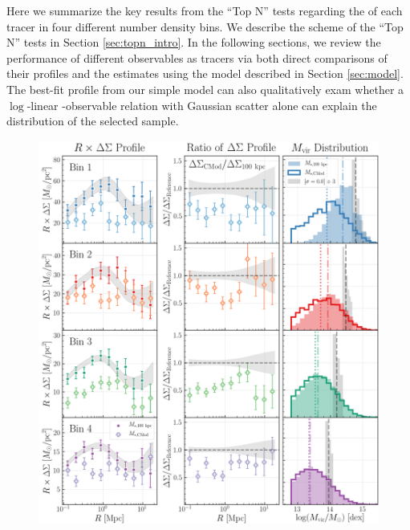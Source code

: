 \documentclass[a4paper,fleqn,usenatbib]{mnras}
\begin{document}
    Here we summarize the key results from the ``Top N'' tests regarding the \sighalo{} of 
    each \mvir{} tracer in four different number density bins.
    We describe the scheme of the ``Top N'' tests in Section \ref{sec:topn_intro}. 
    In the following sections, we review the performance of different observables as \mvir{}
    tracers via both direct comparisons of their \dsigma{} profiles and the \sighalo{}
    estimates using the model described in Section \ref{sec:model}.
    The best-fit \dsigma{} profile from our simple model can also qualitatively exam whether 
    a $\log$-linear \mvir{}-observable relation with Gaussian scatter alone can explain the 
    \mvir{} distribution of the selected sample.

  \begin{figure}
      \centering 
      \includegraphics[width=\textwidth]{figure/topn_dsigma_m100_cmod_compare}
      \caption{
          }
      \label{fig:m100_cmod}
  \end{figure}
\end{document}
